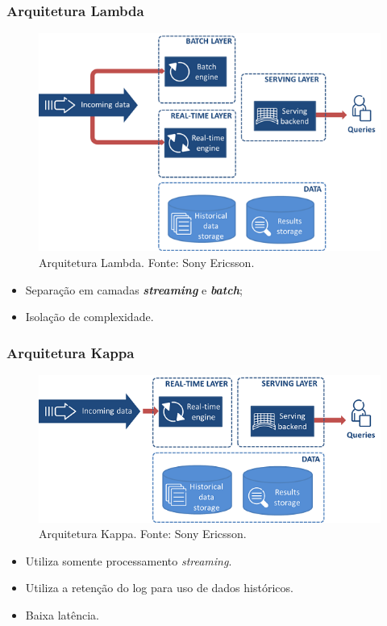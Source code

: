 \documentclass{beamer}
\begin{document}
    \begin{frame}
        \frametitle{Arquitetura Lambda}
        \begin{figure}
            \includegraphics[scale=0.3]{figures/LambdaArchitecture.png}
            \caption{Arquitetura Lambda. Fonte: Sony Ericsson.}
        \end{figure}
        \begin{itemize}
            \item Separação em camadas \textbf{\textit{streaming}} e
                \textbf{\textit{batch}};
            \item Isolação de complexidade.
        \end{itemize}
    \end{frame}
    
    \begin{frame}
        \frametitle{Arquitetura Kappa}
        \begin{figure}
            \includegraphics[scale=0.4]{figures/KappaArchitecture.png}
            \caption{Arquitetura Kappa. Fonte: Sony Ericsson.}
        \end{figure}
        \begin{itemize}
            \item Utiliza somente processamento \textit{streaming}.
            \item Utiliza a retenção do log para uso de dados históricos.
            \item Baixa latência.
        \end{itemize}
    \end{frame}
\end{document}
